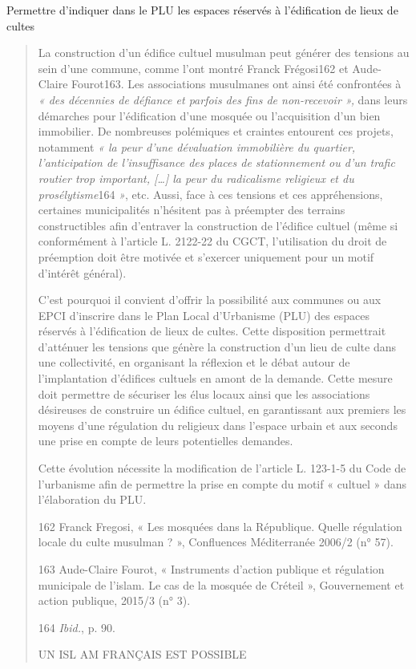 Permettre d'indiquer dans le PLU les espaces réservés à l'édification de
lieux de cultes

\begin{quote}
La construction d'un édifice cultuel musulman peut générer des tensions
au sein d'une commune, comme l'ont montré Franck Frégosi162 et
Aude-Claire Fourot163. Les associations musulmanes ont ainsi été
confrontées à \emph{« des décennies de défiance et parfois des fins de
non-recevoir »,} dans leurs démarches pour l'édification d'une mosquée
ou l'acquisition d'un bien immobilier. De nombreuses polémiques et
craintes entourent ces projets, notamment \emph{« la peur d'une
dévaluation immobilière du quartier, l'anticipation de l'insuffisance
des places de stationnement ou d'un trafic routier trop important,
{[}\ldots{]} la peur du radicalisme religieux et du prosélytisme}164
\emph{»}, etc. Aussi, face à ces tensions et ces appréhensions,
certaines municipalités n'hésitent pas à préempter des terrains
constructibles afin d'entraver la construction de l'édifice cultuel
(même si conformément à l'article L. 2122-22 du CGCT, l'utilisation du
droit de préemption doit être motivée et s'exercer uniquement pour un
motif d'intérêt général).

C'est pourquoi il convient d'offrir la possibilité aux communes ou aux
EPCI d'inscrire dans le Plan Local d'Urbanisme (PLU) des espaces
réservés à l'édification de lieux de cultes. Cette disposition
permettrait d'atténuer les tensions que génère la construction d'un lieu
de culte dans une collectivité, en organisant la réflexion et le débat
autour de l'implantation d'édifices cultuels en amont de la demande.
Cette mesure doit permettre de sécuriser les élus locaux ainsi que les
associations désireuses de construire un édifice cultuel, en
garantissant aux premiers les moyens d'une régulation du religieux dans
l'espace urbain et aux seconds une prise en compte de leurs potentielles
demandes.

Cette évolution nécessite la modification de l'article L. 123-1-5 du
Code de l'urbanisme afin de permettre la prise en compte du motif «
cultuel » dans l'élaboration du PLU.

162 Franck Fregosi, « Les mosquées dans la République. Quelle régulation
locale du culte musulman ? », Confluences Méditerranée 2006/2 (n° 57).

163 Aude-Claire Fourot, « Instruments d'action publique et régulation
municipale de l'islam. Le cas de la mosquée de Créteil », Gouvernement
et action publique, 2015/3 (n° 3).

164 \emph{Ibid.}, p. 90.

UN ISL AM FRANÇAIS EST POSSIBLE
\end{quote}

